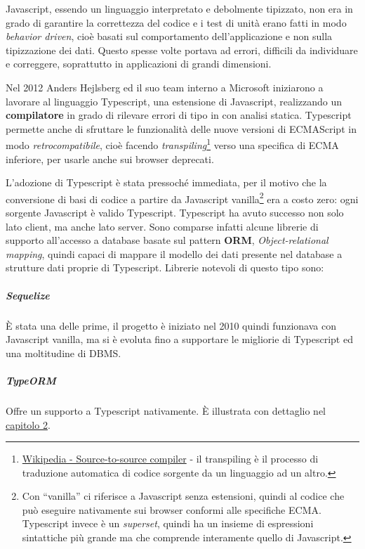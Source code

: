 Javascript, essendo un linguaggio interpretato e debolmente tipizzato,
non era in grado di garantire la correttezza del codice e i test di
unità erano fatti in modo \emph{behavior driven}, cioè basati sul
comportamento dell'applicazione e non sulla tipizzazione dei dati.
Questo spesse volte portava ad errori, difficili da individuare e
correggere, soprattutto in applicazioni di grandi dimensioni.

Nel 2012 Anders Hejlsberg ed il suo team interno a Microsoft iniziarono
a lavorare al linguaggio Typescript, una estensione di Javascript,
realizzando un \textbf{compilatore} in grado di rilevare errori di tipo
in con analisi statica. Typescript permette anche di sfruttare le
funzionalità delle nuove versioni di ECMAScript in modo
\emph{retrocompatibile}, cioè facendo \emph{transpiling}\footnote{\href{https://en.wikipedia.org/wiki/Source-to-source_compiler}{Wikipedia
  - Source-to-source compiler} - il transpiling è il processo di
  traduzione automatica di codice sorgente da un linguaggio ad un altro.}
verso una specifica di ECMA inferiore, per usarle anche sui browser
deprecati.

L'adozione di Typescript è stata pressoché immediata, per il motivo che
la conversione di basi di codice a partire da Javascript
vanilla\footnote{Con ``vanilla'' ci riferisce a Javascript senza
  estensioni, quindi al codice che può eseguire nativamente sui browser
  conformi alle specifiche ECMA. Typescript invece è un \emph{superset},
  quindi ha un insieme di espressioni sintattiche più grande ma che
  comprende interamente quello di Javascript.} era a costo zero: ogni
sorgente Javascript è valido Typescript. Typescript ha avuto successo
non solo lato client, ma anche lato server. Sono comparse infatti alcune
librerie di supporto all'accesso a database basate sul pattern
\textbf{ORM}, \emph{Object-relational mapping}, quindi capaci di mappare
il modello dei dati presente nel database a strutture dati proprie di
Typescript. Librerie notevoli di questo tipo sono:

\subparagraph{Sequelize}\label{sequelize}

È stata una delle prime, il progetto è iniziato nel 2010 quindi
funzionava con Javascript vanilla, ma si è evoluta fino a supportare le
migliorie di Typescript ed una moltitudine di DBMS.

\subparagraph{TypeORM}\label{typeorm}

Offre un supporto a Typescript nativamente. È illustrata con dettaglio
nel \hyperref[descrizione-delle-tecnologie]{capitolo 2}.

